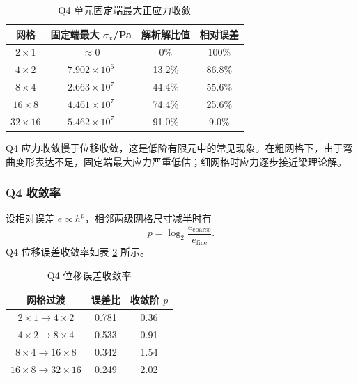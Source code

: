 \documentclass[UTF8,a4paper,zihao=-4]{ctexart}
\begin{document}
\begin{table}[H]
    \centering
    \caption{Q4 单元固定端最大正应力收敛}
    \label{tab:q4_stress_conv}
    \begin{tabular}{cccc}
        \toprule
        网格 & 固定端最大 $\sigma_x$/Pa & 解析解比值 & 相对误差\\
        \midrule
        $2\times1$ & $\approx0$ & 0\% & 100\%\\
        $4\times2$ & $7.902\times10^{6}$ & 13.2\% & 86.8\%\\
        $8\times4$ & $2.663\times10^{7}$ & 44.4\% & 55.6\%\\
        $16\times8$ & $4.461\times10^{7}$ & 74.4\% & 25.6\%\\
        $32\times16$ & $5.462\times10^{7}$ & 91.0\% & 9.0\%\\
        \bottomrule
    \end{tabular}
\end{table}

Q4 应力收敛慢于位移收敛，这是低阶有限元中的常见现象。在粗网格下，由于弯曲变形表达不足，固定端最大应力严重低估；细网格时应力逐步接近梁理论解。

\subsubsection{Q4 收敛率}

设相对误差 $e\propto h^p$，相邻两级网格尺寸减半时有
\begin{equation}
    p
    =
    \log_2\frac{e_{\mathrm{coarse}}}{e_{\mathrm{fine}}}.
\end{equation}
Q4 位移误差收敛率如表 \ref{tab:q4_rate} 所示。

\begin{table}[H]
    \centering
    \caption{Q4 位移误差收敛率}
    \label{tab:q4_rate}
    \begin{tabular}{ccc}
        \toprule
        网格过渡 & 误差比 & 收敛阶 $p$\\
        \midrule
        $2\times1 \rightarrow 4\times2$ & 0.781 & 0.36\\
        $4\times2 \rightarrow 8\times4$ & 0.533 & 0.91\\
        $8\times4 \rightarrow 16\times8$ & 0.342 & 1.54\\
        $16\times8 \rightarrow 32\times16$ & 0.249 & 2.02\\
        \bottomrule
    \end{tabular}
\end{table}
\end{document}
